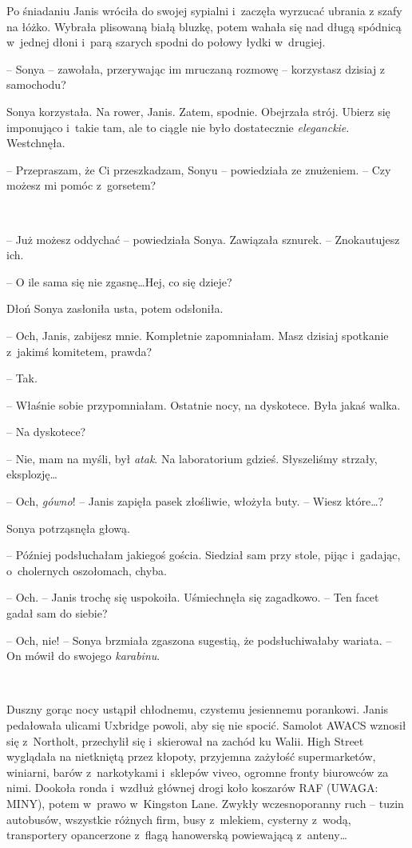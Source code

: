 \documentclass[oneside,polish,11pt,sfheadings]{mwbk}
\begin{document}
Po śniadaniu Janis wróciła do swojej sypialni i~zaczęła wyrzucać ubrania
z szafy na łóżko. Wybrała plisowaną białą bluzkę, potem wahała się nad
długą spódnicą w~jednej dłoni i~parą szarych spodni do połowy łydki w~drugiej.

-- Sonya -- zawołała, przerywając im mruczaną rozmowę -- korzystasz dzisiaj
z samochodu?

Sonya korzystała. Na rower, Janis. Zatem, spodnie. Obejrzała strój.
Ubierz się imponująco i~takie tam, ale to ciągle nie było dostatecznie
\emph{eleganckie}. Westchnęła.

-- Przepraszam, że Ci przeszkadzam, Sonyu -- powiedziała ze znużeniem. --
Czy możesz mi pomóc z~gorsetem?

~

-- Już możesz oddychać -- powiedziała Sonya. Zawiązała sznurek. -- Znokautujesz ich.

-- O ile sama się nie zgasnę\ldots Hej, co się dzieje?

Dłoń Sonya zasłoniła usta, potem odsłoniła.

-- Och, Janis, zabijesz mnie. Kompletnie zapomniałam. Masz dzisiaj
spotkanie z~jakimś komitetem, prawda?

-- Tak.

-- Właśnie sobie przypomniałam. Ostatnie nocy, na dyskotece. Była jakaś
walka.

-- Na dyskotece?

-- Nie, mam na myśli, był \emph{atak}. Na laboratorium gdzieś.
Słyszeliśmy strzały, eksplozję\ldots

-- Och, \emph{gówno}! -- Janis zapięła pasek złośliwie, włożyła buty. -- Wiesz które\ldots?

Sonya potrząsnęła głową. 

-- Później podsłuchałam jakiegoś gościa.
Siedział sam przy stole, pijąc i~gadając, o~cholernych oszołomach,
chyba.

-- Och. -- Janis trochę się uspokoiła. Uśmiechnęła się zagadkowo. -- Ten
facet gadał sam do siebie?

-- Och, nie! -- Sonya brzmiała zgaszona sugestią, że podsłuchiwałaby
wariata. -- On mówił do swojego \emph{karabinu}.
 
~

Duszny gorąc nocy ustąpił chłodnemu, czystemu jesiennemu porankowi.
Janis pedałowała ulicami Uxbridge powoli, aby się nie spocić. Samolot
AWACS wznosił się z~Northolt, przechylił się i~skierował na zachód ku
Walii. High Street wyglądała na nietkniętą przez kłopoty, przyjemna
zażyłość supermarketów, winiarni, barów z~narkotykami i~sklepów viveo,
ogromne fronty biurowców za nimi. Dookoła ronda i~wzdłuż głównej drogi
koło koszarów RAF (UWAGA: MINY), potem w~prawo w~Kingston Lane. Zwykły
wczesnoporanny ruch -- tuzin autobusów, wszystkie różnych firm, busy z~mlekiem, cysterny z~wodą, transportery opancerzone z~flagą hanowerską
powiewającą z~anteny\ldots
\end{document}
